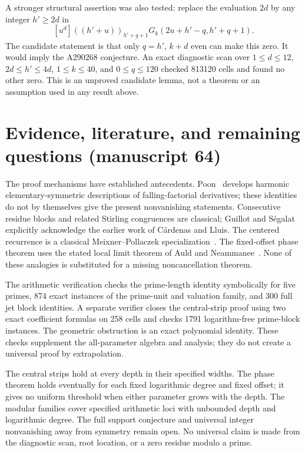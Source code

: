 \documentclass[11pt,a4paper]{article}
\numberwithin{equation}{section}
\newcommand{\fall}[2]{(#1)_{\underline{#2}}}
\begin{document}
A stronger structural assertion was also tested: replace the evaluation $2d$ by any integer $h'\ge2d$ in
\[
 [u^d]\fall{(h'+u)}{h'+q+1}
 G_k(2u+h'-q,h'+q+1).
\]
The candidate statement is that only $q=h'$, $k+d$ even can make this zero. It would imply the A290268 conjecture. An exact diagnostic scan over $1\le d\le12$, $2d\le h'\le4d$, $1\le k\le40$, and $0\le q\le120$ checked 813120 cells and found no other zero. This is an unproved candidate lemma, not a theorem or an assumption used in any result above.

\section{Evidence, literature, and remaining questions (manuscript 64)}
The proof mechanisms have established antecedents. Poon~\cite{poon} develops harmonic elementary-symmetric descriptions of falling-factorial derivatives; these identities do not by themselves give the present nonvanishing statements. Consecutive residue blocks and related Stirling congruences are classical; Guillot and S\'egalat~\cite{guillot} explicitly acknowledge the earlier work of C\'ardenas and Lluis. The centered recurrence is a classical Meixner--Pollaczek specialization~\cite{dlmf}. The fixed-offset phase theorem uses the stated local limit theorem of Auld and Neammanee~\cite{auld-neammanee-2024}. None of these analogies is substituted for a missing noncancellation theorem.

The arithmetic verification checks the prime-length identity symbolically for five primes, 874 exact instances of the prime-unit and valuation family, and 300 full jet block identities. A separate verifier closes the central-strip proof using two exact coefficient formulas on 258 cells and checks 1791 logarithm-free prime-block instances. The geometric obstruction is an exact polynomial identity. These checks supplement the all-parameter algebra and analysis; they do not create a universal proof by extrapolation.

The central strips hold at every depth in their specified widths. The phase theorem holds eventually for each fixed logarithmic degree and fixed offset; it gives no uniform threshold when either parameter grows with the depth. The modular families cover specified arithmetic loci with unbounded depth and logarithmic degree. The full support conjecture and universal integer nonvanishing away from symmetry remain open. No universal claim is made from the diagnostic scan, root location, or a zero residue modulo a prime.
\end{document}

